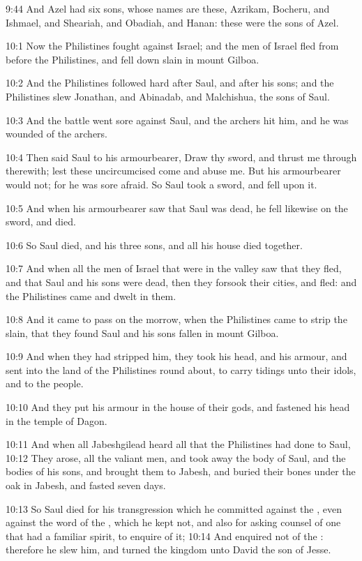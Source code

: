 9:44 And Azel had six sons, whose names are these, Azrikam, Bocheru,
and Ishmael, and Sheariah, and Obadiah, and Hanan: these were the sons
of Azel.

10:1 Now the Philistines fought against Israel; and the men of Israel
fled from before the Philistines, and fell down slain in mount Gilboa.

10:2 And the Philistines followed hard after Saul, and after his sons;
and the Philistines slew Jonathan, and Abinadab, and Malchishua, the
sons of Saul.

10:3 And the battle went sore against Saul, and the archers hit him,
and he was wounded of the archers.

10:4 Then said Saul to his armourbearer, Draw thy sword, and thrust me
through therewith; lest these uncircumcised come and abuse me. But his
armourbearer would not; for he was sore afraid. So Saul took a sword,
and fell upon it.

10:5 And when his armourbearer saw that Saul was dead, he fell
likewise on the sword, and died.

10:6 So Saul died, and his three sons, and all his house died
together.

10:7 And when all the men of Israel that were in the valley saw that
they fled, and that Saul and his sons were dead, then they forsook
their cities, and fled: and the Philistines came and dwelt in them.

10:8 And it came to pass on the morrow, when the Philistines came to
strip the slain, that they found Saul and his sons fallen in mount
Gilboa.

10:9 And when they had stripped him, they took his head, and his
armour, and sent into the land of the Philistines round about, to
carry tidings unto their idols, and to the people.

10:10 And they put his armour in the house of their gods, and fastened
his head in the temple of Dagon.

10:11 And when all Jabeshgilead heard all that the Philistines had
done to Saul, 10:12 They arose, all the valiant men, and took away the
body of Saul, and the bodies of his sons, and brought them to Jabesh,
and buried their bones under the oak in Jabesh, and fasted seven days.

10:13 So Saul died for his transgression which he committed against
the \LORD, even against the word of the \LORD, which he kept not, and
also for asking counsel of one that had a familiar spirit, to enquire
of it; 10:14 And enquired not of the \LORD: therefore he slew him, and
turned the kingdom unto David the son of Jesse.


